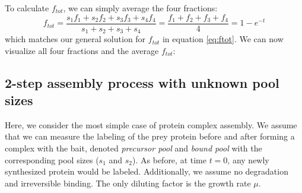 \documentclass{article}
\begin{document}
To calculate $f_{tot}$, we can simply average the four fractions:
\begin{equation}
    f_{tot} = \frac{s_1 f_1 + s_2 f_2 + s_3 f_3 + s_4 f_4}{s_1 + s_2 + s_3 + s_4} = \frac{f_1 + f_2 + f_3 + f_4}{4} = 1 - e^{-t}
\end{equation}
which matches our general solution for $f_{tot}$ in equation \ref{eq:ftot}. We can now visualize all four fractions and the average $f_{tot}$:
\begin{center}
\end{center}

\subsection{2-step assembly process with unknown pool sizes}
Here, we consider the most simple case of protein complex assembly. We assume that we can measure the labeling of the prey protein before and after forming a complex with the bait, denoted \textit{precursor pool} and \textit{bound pool} with the corresponding pool sizes ($s_1$ and $s_2$). As before, at time $t = 0$, any newly synthesized protein would be labeled. Additionally, we assume no degradation and irreversible binding. The only diluting factor is the growth rate $\mu$.
\end{document}
